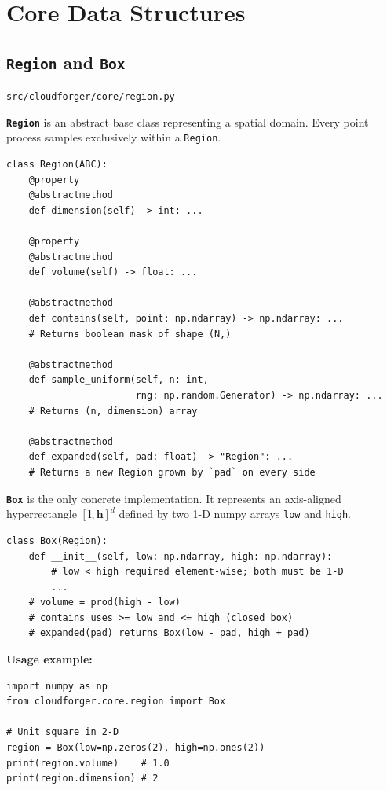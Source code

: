 \documentclass[11pt, a4paper]{article}
\newcommand{\code}[1]{\texttt{#1}}
\newcommand{\pyfile}[1]{\texttt{\small #1}}
\newcommand{\typename}[1]{\textbf{\texttt{#1}}}
\begin{document}
\section{Core Data Structures}
\label{sec:datastructs}

\subsection{\typename{Region} and \typename{Box}}
\label{subsec:region}
\pyfile{src/cloudforger/core/region.py}

\typename{Region} is an abstract base class representing a spatial domain.
Every point process samples exclusively within a \code{Region}.

\begin{lstlisting}
class Region(ABC):
    @property
    @abstractmethod
    def dimension(self) -> int: ...

    @property
    @abstractmethod
    def volume(self) -> float: ...

    @abstractmethod
    def contains(self, point: np.ndarray) -> np.ndarray: ...
    # Returns boolean mask of shape (N,)

    @abstractmethod
    def sample_uniform(self, n: int,
                       rng: np.random.Generator) -> np.ndarray: ...
    # Returns (n, dimension) array

    @abstractmethod
    def expanded(self, pad: float) -> "Region": ...
    # Returns a new Region grown by `pad` on every side
\end{lstlisting}

\typename{Box} is the only concrete implementation.
It represents an axis-aligned hyperrectangle $[\mathbf{l}, \mathbf{h}]^d$
defined by two 1-D numpy arrays \code{low} and \code{high}.

\begin{lstlisting}
class Box(Region):
    def __init__(self, low: np.ndarray, high: np.ndarray):
        # low < high required element-wise; both must be 1-D
        ...
    # volume = prod(high - low)
    # contains uses >= low and <= high (closed box)
    # expanded(pad) returns Box(low - pad, high + pad)
\end{lstlisting}

\textbf{Usage example:}
\begin{lstlisting}
import numpy as np
from cloudforger.core.region import Box

# Unit square in 2-D
region = Box(low=np.zeros(2), high=np.ones(2))
print(region.volume)    # 1.0
print(region.dimension) # 2
\end{lstlisting}
\end{document}
